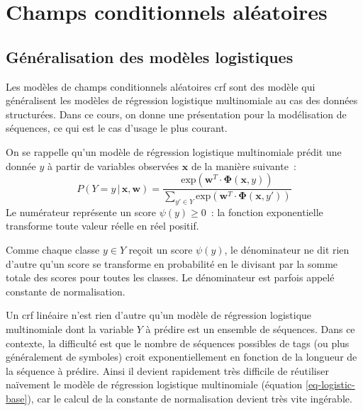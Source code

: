 \documentclass[11pt,openany]{book}
\newcommand{\ac}[1]{{\sc #1}} %
\begin{document}
\chapter{Champs conditionnels aléatoires}

\section{Généralisation des modèles logistiques}

Les modèles de champs conditionnels aléatoires \ac{crf}
sont des modèle qui généralisent les modèles de régression logistique multinomiale au cas des données structurées.
Dans ce cours, on  donne une présentation pour la modélisation de séquences, ce qui est le cas d'usage le plus courant.

On se rappelle qu'un modèle de régression logistique multinomiale prédit une donnée $y$ à partir de variables observées $\mathbf{x}$ de la manière suivante~:
\begin{equation}
\label{eq-logistic-base}
P(Y = y \,|\, \mathbf{x},\mathbf{w}) = \frac{\text{exp}(\mathbf{w}^T \cdot \boldsymbol\Phi(\mathbf{x},y))}{\sum_{y'\in Y}\text{exp}(\mathbf{w}^T \cdot \boldsymbol\Phi(\mathbf{x},y'))}
\end{equation}
Le numérateur représente un score $\psi(y) \geq 0$~: la fonction exponentielle transforme toute valeur réelle en  réel positif. 

Comme chaque classe $y\in Y$ reçoit un score $\psi(y)$,
le dénominateur ne dit rien d'autre qu'un score se transforme en probabilité en le divisant par la somme totale des scores pour toutes les classes. Le dénominateur est parfois appelé constante de normalisation.

Un \ac{crf} linéaire n'est rien d'autre qu'un modèle de régression logistique multinomiale dont la variable $Y$ à prédire est un ensemble de séquences. Dans ce contexte, la difficulté est que le nombre de séquences possibles de tags (ou plus généralement de symboles) croit exponentiellement en fonction de la longueur de la séquence à prédire.
Ainsi il devient rapidement très difficile de réutiliser naïvement le modèle de régression logistique multinomiale (équation \ref{eq-logistic-base}), car le calcul de la constante de normalisation devient très vite ingérable.
\end{document}
